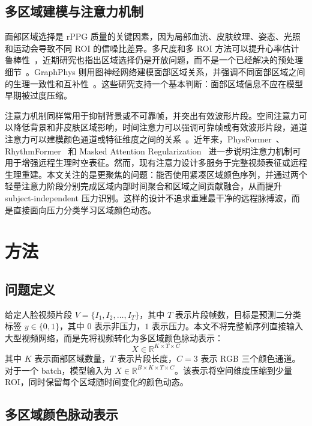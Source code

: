 \documentclass[runningheads]{llncs}
\begin{document}
\subsection{多区域建模与注意力机制}

面部区域选择是 rPPG 质量的关键因素，因为局部血流、皮肤纹理、姿态、光照和运动会导致不同 ROI 的信噪比差异。多尺度和多 ROI 方法可以提升心率估计鲁棒性~\cite{zhao2020multiscale}，近期研究也指出区域选择仍是开放问题，而不是一个已经解决的预处理细节~\cite{bondarenko2025regions}。GraphPhys 则用图神经网络建模面部区域关系，并强调不同面部区域之间的生理一致性和互补性~\cite{xiong2023graphphys}。这些研究支持一个基本判断：面部区域信息不应在模型早期被过度压缩。

注意力机制同样常用于抑制背景或不可靠帧，并突出有效波形片段。空间注意力可以降低背景和非皮肤区域影响，时间注意力可以强调可靠帧或有效波形片段，通道注意力可以建模颜色通道或特征维度之间的关系~\cite{chen2018deepphys,liu2020mttscan,xu2024mtasr}。近年来，PhysFormer~\cite{yu2022physformer}、RhythmFormer~\cite{zou2025rhythmformer} 和 Masked Attention Regularization~\cite{zhao2024mar} 进一步说明注意力机制可用于增强远程生理时空表征。然而，现有注意力设计多服务于完整视频表征或远程生理重建。本文关注的是更聚焦的问题：能否使用紧凑区域颜色序列，并通过两个轻量注意力阶段分别完成区域内部时间聚合和区域之间贡献融合，从而提升 subject-independent 压力识别。这样的设计不追求重建最干净的远程脉搏波，而是直接面向压力分类学习区域颜色动态。

\section{方法}

\subsection{问题定义}

给定人脸视频片段 $V=\{I_1,I_2,\ldots,I_T\}$，其中 $T$ 表示片段帧数，目标是预测二分类标签 $y \in \{0,1\}$，其中 $0$ 表示非压力，$1$ 表示压力。本文不将完整帧序列直接输入大型视频网络，而是先将视频转化为多区域颜色脉动表示：
\begin{equation}
    X \in \mathbb{R}^{K \times T \times C}
\end{equation}
其中 $K$ 表示面部区域数量，$T$ 表示片段长度，$C=3$ 表示 RGB 三个颜色通道。对于一个 batch，模型输入为 $X \in \mathbb{R}^{B \times K \times T \times C}$。该表示将空间维度压缩到少量 ROI，同时保留每个区域随时间变化的颜色动态。

\subsection{多区域颜色脉动表示}
\end{document}

